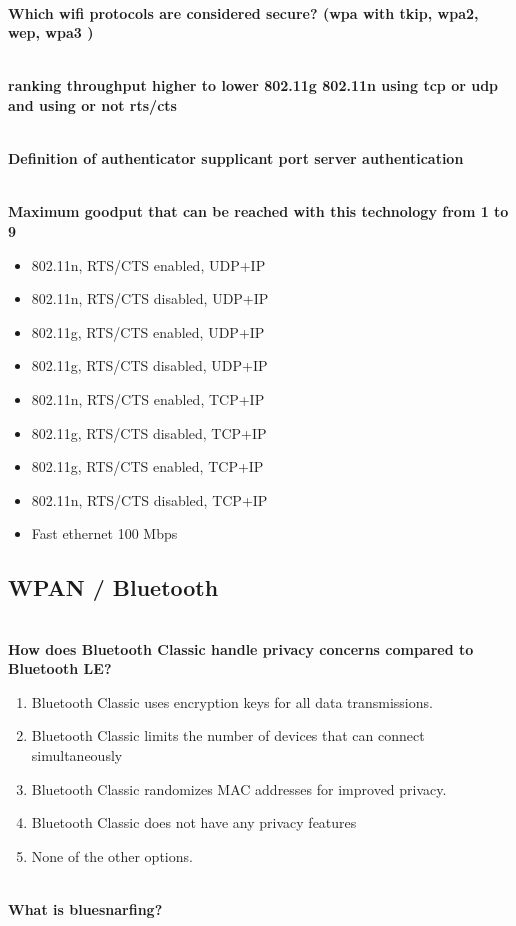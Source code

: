 \textbf{\\Which wifi protocols are considered secure? (wpa with tkip, wpa2, wep, wpa3 ) }

\textbf{\\ranking throughput higher to lower 802.11g 802.11n using tcp or udp and using or not rts/cts }

\textbf{\\Definition of authenticator supplicant port server authentication}

\textbf{\\Maximum goodput that can be reached with this technology from 1 to 9}
\begin{itemize}
    \item 802.11n, RTS/CTS enabled, UDP+IP
	\item 802.11n, RTS/CTS disabled, UDP+IP
	\item 802.11g, RTS/CTS enabled, UDP+IP
	\item 802.11g, RTS/CTS disabled, UDP+IP
	\item 802.11n, RTS/CTS enabled, TCP+IP
	\item 802.11g, RTS/CTS disabled, TCP+IP
	\item 802.11g, RTS/CTS enabled, TCP+IP
	\item 802.11n, RTS/CTS disabled, TCP+IP
	\item Fast ethernet 100 Mbps
\end{itemize}
	

\subsection{WPAN / Bluetooth}

\textbf{\\How does Bluetooth Classic handle privacy concerns compared to Bluetooth LE?}
\begin{enumerate}
    \item Bluetooth Classic uses encryption keys for all data transmissions.
    \item Bluetooth Classic limits the number of devices that can connect simultaneously 
    \item Bluetooth Classic randomizes MAC addresses for improved privacy.
    \item Bluetooth Classic does not have any privacy features
    \item None of the other options.
\end{enumerate}


\textbf{\\What is bluesnarfing?}

